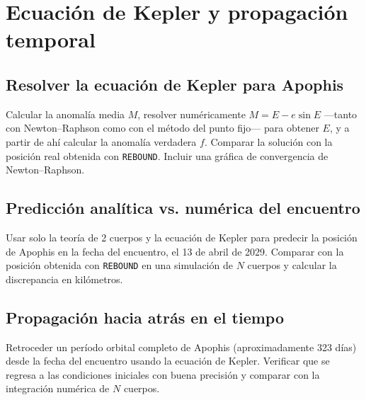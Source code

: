 \section{Ecuación de Kepler y propagación temporal}

\subsection{Resolver la ecuación de Kepler para Apophis}

Calcular la anomalía media $M$, resolver numéricamente $M = E - e \sin E$ ---tanto con Newton--Raphson como con el método del punto fijo--- para obtener $E$, y a partir de ahí calcular la anomalía verdadera $f$. Comparar la solución con la posición real obtenida con \texttt{REBOUND}. Incluir una gráfica de convergencia de Newton--Raphson.

\subsection{Predicción analítica vs. numérica del encuentro}

Usar solo la teoría de 2 cuerpos y la ecuación de Kepler para predecir la posición de Apophis en la fecha del encuentro, el 13 de abril de 2029. Comparar con la posición obtenida con \texttt{REBOUND} en una simulación de $N$ cuerpos y calcular la discrepancia en kilómetros.

\subsection{Propagación hacia atrás en el tiempo}

Retroceder un período orbital completo de Apophis (aproximadamente 323 días) desde la fecha del encuentro usando la ecuación de Kepler. Verificar que se regresa a las condiciones iniciales con buena precisión y comparar con la integración numérica de $N$ cuerpos.